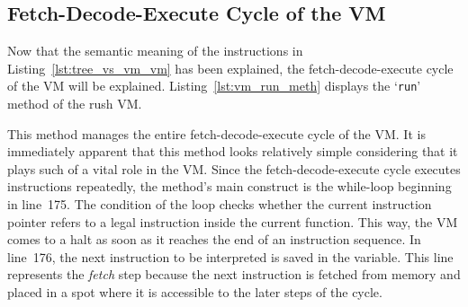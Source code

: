 \subsection{Fetch-Decode-Execute Cycle of the VM}
Now that the semantic meaning of the instructions in Listing~\ref{lst:tree_vs_vm_vm} has been explained, the fetch-decode-execute cycle of the VM will be explained\@.
Listing~\ref{lst:vm_run_meth} displays the `\texttt{run}' method of the rush VM\@.


This method manages the entire fetch-decode-execute cycle of the VM\@.
It is immediately apparent that this method looks relatively simple considering that it plays such of a vital role in the VM\@.
Since the fetch-decode-execute cycle executes instructions repeatedly, the method's main construct is the while-loop beginning in line~175.
The condition of the loop checks whether the current instruction pointer refers to a legal instruction inside the current function.
This way, the VM comes to a halt as soon as it reaches the end of an instruction sequence.
In line~176, the next instruction to be interpreted is saved in the  variable.
This line represents the \emph{fetch} step because the next instruction is fetched from memory and placed in a spot where it is accessible to the later steps of the cycle.

